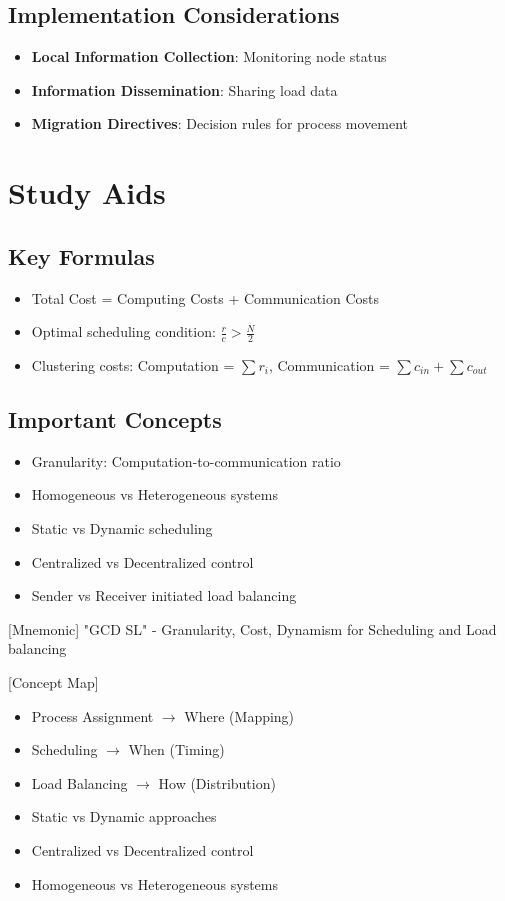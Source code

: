 \documentclass[12pt]{article}
\begin{document}
\subsection{Implementation Considerations}
\begin{itemize}
  \item \textbf{Local Information Collection}: Monitoring node status
  \item \textbf{Information Dissemination}: Sharing load data
  \item \textbf{Migration Directives}: Decision rules for process movement
\end{itemize}

\section*{Study Aids}

\subsection*{Key Formulas}
\begin{itemize}
  \item Total Cost = Computing Costs + Communication Costs
  \item Optimal scheduling condition: $\frac{r}{c} > \frac{N}{2}$
  \item Clustering costs: Computation = $\sum r_i$, Communication = $\sum c_{in} + \sum c_{out}$
\end{itemize}

\subsection*{Important Concepts}
\begin{itemize}
  \item Granularity: Computation-to-communication ratio
  \item Homogeneous vs Heterogeneous systems
  \item Static vs Dynamic scheduling
  \item Centralized vs Decentralized control
  \item Sender vs Receiver initiated load balancing
\end{itemize}

[Mnemonic] "GCD SL" - Granularity, Cost, Dynamism for Scheduling and Load balancing

  [Concept Map]
\begin{itemize}
  \item Process Assignment $\rightarrow$ Where (Mapping)
  \item Scheduling $\rightarrow$ When (Timing)
  \item Load Balancing $\rightarrow$ How (Distribution)
  \item Static vs Dynamic approaches
  \item Centralized vs Decentralized control
  \item Homogeneous vs Heterogeneous systems
\end{itemize}
\end{document}
